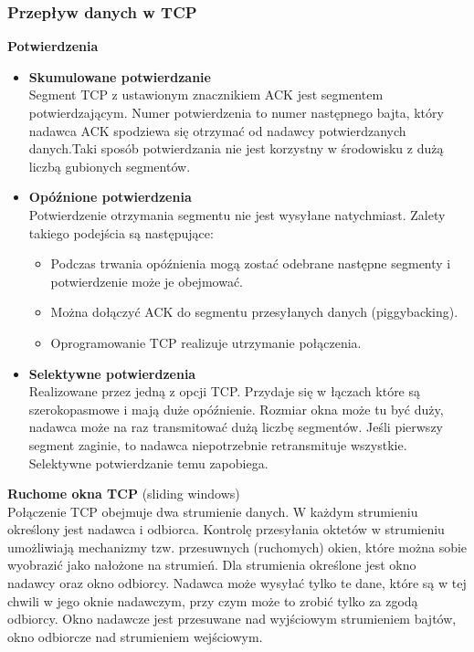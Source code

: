 \documentclass[a4paper]{article}
\begin{document}
\subsubsection{Przepływ danych w TCP}
\textbf{Potwierdzenia}
\begin{itemize}
    \item \textbf{Skumulowane potwierdzanie}\\
    Segment TCP z ustawionym znacznikiem ACK jest segmentem potwierdzającym. Numer
potwierdzenia to numer następnego bajta, który nadawca ACK spodziewa się otrzymać od nadawcy potwierdzanych danych.Taki sposób potwierdzania nie jest korzystny w
środowisku z dużą liczbą gubionych segmentów.
    \item \textbf{Opóźnione potwierdzenia}\\
    Potwierdzenie otrzymania segmentu nie jest wysyłane natychmiast. Zalety takiego podejścia
są następujące:
    \begin{itemize}
        \item Podczas trwania opóźnienia mogą zostać odebrane następne segmenty i potwierdzenie może je obejmować.
        \item Można dołączyć ACK do segmentu przesyłanych danych (piggybacking).
        \item Oprogramowanie TCP realizuje utrzymanie połączenia.
    \end{itemize}
    \item \textbf{Selektywne potwierdzenia}\\
    Realizowane przez jedną z opcji TCP. Przydaje się w łączach które są szerokopasmowe i mają duże opóźnienie. Rozmiar okna może tu być duży, nadawca może na raz transmitować dużą liczbę segmentów. Jeśli pierwszy segment zaginie, to nadawca niepotrzebnie retransmituje wszystkie. Selektywne potwierdzanie temu zapobiega.
\end{itemize}

\textbf{Ruchome okna TCP} (sliding windows)\\
Połączenie TCP obejmuje dwa strumienie danych. W każdym strumieniu określony jest
nadawca i odbiorca. Kontrolę przesyłania oktetów w strumieniu umożliwiają mechanizmy
tzw. przesuwnych (ruchomych) okien, które można sobie wyobrazić jako nałożone na
strumień. Dla strumienia określone jest okno nadawcy oraz okno odbiorcy. Nadawca może
wysyłać tylko te dane, które są w tej chwili w jego oknie nadawczym, przy czym może to
zrobić tylko za zgodą odbiorcy. Okno nadawcze jest przesuwane nad wyjściowym
strumieniem bajtów, okno odbiorcze nad strumieniem wejściowym.
\end{document}
